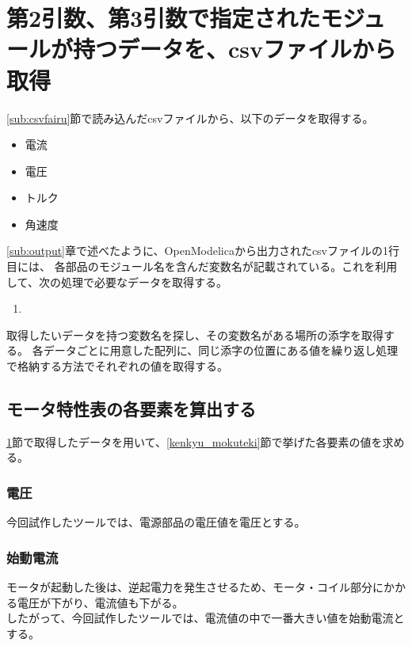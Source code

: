 \section{第2引数、第3引数で指定されたモジュールが持つデータを、csvファイルから取得}\label{sub:syutoku_data}
\ref{sub:csvfairu}節で読み込んだcsvファイルから、以下のデータを取得する。

\begin{itemize}
    \item 電流
    \item 電圧
    \item トルク
    \item 角速度
\end{itemize}

\ref{sub:output}章で述べたように、OpenModelicaから出力されたcsvファイルの1行目には、
各部品のモジュール名を含んだ変数名が記載されている。これを利用して、次の処理で必要なデータを取得する。

\begin{enumerate}
    \item 
\end{enumerate}
取得したいデータを持つ変数名を探し、その変数名がある場所の添字を取得する。
各データごとに用意した配列に、同じ添字の位置にある値を繰り返し処理で格納する方法でそれぞれの値を取得する。

\subsection{モータ特性表の各要素を算出する}\label{sub:keisan}
\ref{sub:syutoku_data}節で取得したデータを用いて、\ref{kenkyu_mokuteki}節で挙げた各要素の値を求める。

\subsubsection{電圧}\label{sub:keisan_dennatu}
今回試作したツールでは、電源部品の電圧値を電圧とする。

\subsubsection{始動電流}\label{sub:keisan_sidouden}
モータが起動した後は、逆起電力を発生させるため、モータ・コイル部分にかかる電圧が下がり、電流値も下がる。\\
したがって、今回試作したツールでは、電流値の中で一番大きい値を始動電流とする。

